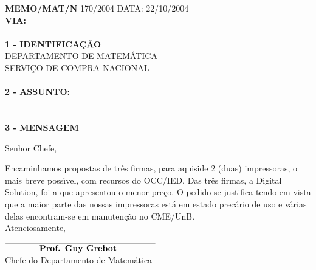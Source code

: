 \addtolength{\oddsidemargin}{-2pc}
\addtolength{\evensidemargin}{2pc}
\setlength{\topmargin}{.5cm}
\setlength{\textwidth}{16cm} 
\setlength{\textheight}{25cm}
\pagestyle{empty}

\vspace*{1.3cm}
\timbrado
\parindent=2cm 
\setlength{\baselineskip}{5mm}
\noindent 
\begin{minipage}{16cm}
\vspace*{-1.8cm}
\parindent=2cm
\setlength{\baselineskip}{5mm}
\vspace*{1.5cm}
\noindent
\small
{\bf  MEMO/MAT/N\primo} 170/2004 \hfill {DATA:} {22/10/2004}
\vum \\
{\bf VIA:} {}  
\\
\mbox{} \hrulefill\
\\
{\bf 1 - IDENTIFICA\c{C}\~AO} 
\\
\phantom{xxx}{\bf Proced\^encia:} {DEPARTAMENTO DE MATEM\'ATICA}
\\
 {SERVI\c{C}O DE COMPRA NACIONAL}
\\
\mbox{} \hrulefill\
\\
{\bf 2 - ASSUNTO:} \\
\phantom{xxx}{Propostas de firmas para compra de duas impressoras}
\\
\mbox{} \hrulefill\
\\
{ \bf 3 - MENSAGEM} 
\end{minipage}
\setlength{\baselineskip}{6mm}
\vspace*{1.7cm} 

Senhor Chefe,

\bigskip

Encaminhamos propostas de tr\^es firmas, para aquisi\cao de 2 (duas) impressoras, o mais breve poss\'{\i}vel, com recursos do OCC/IED. Das tr\^es firmas, a Digital Solution, foi a que apresentou o menor pre\c{c}o. O pedido se justifica tendo em vista que a maior parte das nossas impressoras est\'a em estado prec\'ario de uso e v\'arias delas  encontram-se em manuten\c{c}\~ao no CME/UnB.     
\vspace*{8mm} \\
\hspace*{8.5cm} Atenciosamente,
\vspace*{2cm} \\
\hspace*{5cm} 
\begin{minipage}{10cm}
\setlength{\baselineskip}{4mm}
\begin{center} 
$\overline{\phantom{xxxxxxx}\mbox{\bf  
Prof. Guy Grebot} \phantom{xxxxxxxx}}$ 
\\
Chefe do Departamento de Matem\'atica
\end{center}
\end{minipage}



 
